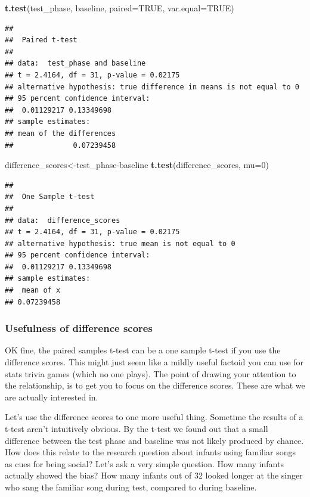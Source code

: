 \documentclass[]{book}
\newenvironment{Shaded}{\begin{snugshade}}{\end{snugshade}}
\newcommand{\KeywordTok}[1]{\textcolor[rgb]{0.13,0.29,0.53}{\textbf{{#1}}}}
\newcommand{\DataTypeTok}[1]{\textcolor[rgb]{0.13,0.29,0.53}{{#1}}}
\newcommand{\DecValTok}[1]{\textcolor[rgb]{0.00,0.00,0.81}{{#1}}}
\newcommand{\OtherTok}[1]{\textcolor[rgb]{0.56,0.35,0.01}{{#1}}}
\newcommand{\NormalTok}[1]{{#1}}
\theoremstyle{definition}
\theoremstyle{definition}
\theoremstyle{definition}
\theoremstyle{remark}
\begin{document}
\begin{Shaded}
\begin{Highlighting}[]
\KeywordTok{t.test}\NormalTok{(test_phase, baseline, }\DataTypeTok{paired=}\OtherTok{TRUE}\NormalTok{, }\DataTypeTok{var.equal=}\OtherTok{TRUE}\NormalTok{)}
\end{Highlighting}
\end{Shaded}

\begin{verbatim}
## 
##  Paired t-test
## 
## data:  test_phase and baseline
## t = 2.4164, df = 31, p-value = 0.02175
## alternative hypothesis: true difference in means is not equal to 0
## 95 percent confidence interval:
##  0.01129217 0.13349698
## sample estimates:
## mean of the differences 
##              0.07239458
\end{verbatim}

\begin{Shaded}
\begin{Highlighting}[]
\NormalTok{difference_scores<-test_phase-baseline}
\KeywordTok{t.test}\NormalTok{(difference_scores, }\DataTypeTok{mu=}\DecValTok{0}\NormalTok{)}
\end{Highlighting}
\end{Shaded}

\begin{verbatim}
## 
##  One Sample t-test
## 
## data:  difference_scores
## t = 2.4164, df = 31, p-value = 0.02175
## alternative hypothesis: true mean is not equal to 0
## 95 percent confidence interval:
##  0.01129217 0.13349698
## sample estimates:
##  mean of x 
## 0.07239458
\end{verbatim}

\subsubsection{Usefulness of difference
scores}\label{usefulness-of-difference-scores}

OK fine, the paired samples t-test can be a one sample t-test if you use
the difference scores. This might just seem like a mildly useful factoid
you can use for stats trivia games (which no one plays). The point of
drawing your attention to the relationship, is to get you to focus on
the difference scores. These are what we are actually interested in.

Let's use the difference scores to one more useful thing. Sometime the
results of a t-test aren't intuitively obvious. By the t-test we found
out that a small difference between the test phase and baseline was not
likely produced by chance. How does this relate to the research question
about infants using familiar songs as cues for being social? Let's ask a
very simple question. How many infants actually showed the bias? How
many infants out of 32 looked longer at the singer who sang the familiar
song during test, compared to during baseline.
\end{document}
